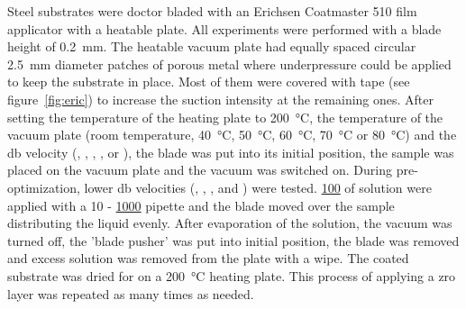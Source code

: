 Steel substrates were doctor bladed with an Erichsen Coatmaster 510 film applicator with a heatable plate.
All experiments were performed with a blade height of \SI{0.2}{\milli\meter}.
%
The heatable vacuum plate had equally spaced circular \SI{2.5}{\milli\meter} diameter patches of porous metal where underpressure could be applied to keep the substrate in place. 
Most of them were covered with tape (see figure~\ref{fig:eric}) to increase the suction intensity at the remaining ones.
After setting the temperature of the heating plate to \SI{200}{\celsius}, the temperature of the vacuum plate 
(room temperature, \SI{40}{\celsius}, \SI{50}{\celsius}, \SI{60}{\celsius}, \SI{70}{\celsius} or \SI{80}{\celsius}) 
and the \gls{db} velocity (, , , ,  or ), 
the blade was put into its initial position, the sample was placed on the vacuum plate and the vacuum 
was switched on. 
During pre-optimization, lower \gls{db} velocities (, , 
,  and ) were tested. 
\ul{100} of solution were 
applied with a 10 - \ul{1000} pipette and the blade moved over the sample distributing the 
liquid evenly. After evaporation of the solution, the vacuum was turned off, the 'blade 
pusher' was put into initial position, the blade was removed and excess solution 
was removed from the plate with a wipe. 
The coated substrate was dried for  on a \SI{200}{\celsius} heating plate.
This process of applying a \gls{zro} layer was repeated as many times as needed.
